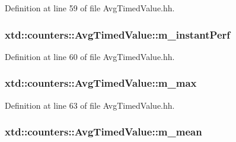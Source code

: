 Definition at line 59 of file Avg\+Timed\+Value.\+hh.

\subsubsection[{\texorpdfstring{m\+\_\+instant\+Perf}{m_instantPerf}}]{ xtd\+::counters\+::\+Avg\+Timed\+Value\+::m\+\_\+instant\+Perf}\hypertarget{classxtd_1_1counters_1_1AvgTimedValue_a16f6336d72850b29aa10a97d72309ec4}{}\label{classxtd_1_1counters_1_1AvgTimedValue_a16f6336d72850b29aa10a97d72309ec4}


Definition at line 60 of file Avg\+Timed\+Value.\+hh.

\subsubsection[{\texorpdfstring{m\+\_\+max}{m_max}}]{ xtd\+::counters\+::\+Avg\+Timed\+Value\+::m\+\_\+max}\hypertarget{classxtd_1_1counters_1_1AvgTimedValue_a90ef2640c6d711a3eef2585aaef50afb}{}\label{classxtd_1_1counters_1_1AvgTimedValue_a90ef2640c6d711a3eef2585aaef50afb}


Definition at line 63 of file Avg\+Timed\+Value.\+hh.

\subsubsection[{\texorpdfstring{m\+\_\+mean}{m_mean}}]{ xtd\+::counters\+::\+Avg\+Timed\+Value\+::m\+\_\+mean}\hypertarget{classxtd_1_1counters_1_1AvgTimedValue_ab0eb52c60a1fe28c6ea148270ca8cc74}{}\label{classxtd_1_1counters_1_1AvgTimedValue_ab0eb52c60a1fe28c6ea148270ca8cc74}


